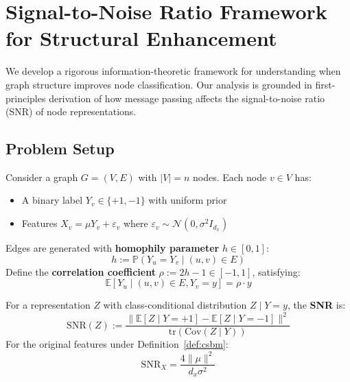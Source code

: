 
\section{Signal-to-Noise Ratio Framework for Structural Enhancement}
\label{sec:snr_theory}

We develop a rigorous information-theoretic framework for understanding when graph structure improves node classification. Our analysis is grounded in first-principles derivation of how message passing affects the signal-to-noise ratio (SNR) of node representations.

\subsection{Problem Setup}
\label{subsec:setup}

\begin{definition}
\label{def:csbm}
Consider a graph $G = (V, E)$ with $|V| = n$ nodes. Each node $v \in V$ has:
\begin{itemize}
    \item A binary label $Y_v \in \{+1, -1\}$ with uniform prior
    \item Features $X_v = \mu Y_v + \varepsilon_v$ where $\varepsilon_v \sim \mathcal{N}(0, \sigma^2 I_{d_x})$
\end{itemize}
Edges are generated with \textbf{homophily parameter} $h \in [0, 1]$:
\begin{equation}
    h := \mathbb{P}(Y_u = Y_v \mid (u, v) \in E)
\end{equation}
Define the \textbf{correlation coefficient} $\rho := 2h - 1 \in [-1, 1]$, satisfying:
\begin{equation}
    \mathbb{E}[Y_u \mid (u,v) \in E, Y_v = y] = \rho \cdot y
\end{equation}
\end{definition}

\begin{definition}
\label{def:snr}
For a representation $Z$ with class-conditional distribution $Z \mid Y = y$, the \textbf{SNR} is:
\begin{equation}
    \mathrm{SNR}(Z) := \frac{\|\mathbb{E}[Z \mid Y=+1] - \mathbb{E}[Z \mid Y=-1]\|^2}{\mathrm{tr}(\mathrm{Cov}(Z \mid Y))}
\end{equation}
For the original features under Definition~\ref{def:csbm}:
\begin{equation}
    \mathrm{SNR}_X = \frac{4\|\mu\|^2}{d_x \sigma^2}
\end{equation}
\end{definition}

